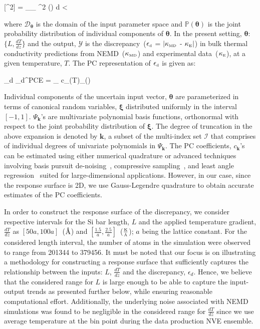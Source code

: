 \be
{}[^2] = \int_{_{\bm{\theta}}} ^2 (\bm{\theta}) 
d\bm{\theta} < \infty
\ee

\noindent where $\mathcal{D}_{\bm{\theta}}$ is the domain of the input parameter space and 
$\mathbb{P}(\bm{\theta})$ is the joint probability distribution of individual components of $\bm{\theta}$.
In the present setting, $\bm{\theta}$:~$\{L,\frac{dT}{dz}\}$ and the output, $\mathcal{Y}$ is the
discrepancy~($\epsilon_{\mbox{\tiny{d}}}$ = 
$\lvert\kappa_{\mbox{\tiny{MD}}}$ - $\kappa_{\mbox{\tiny{E}}}\rvert$)
in bulk thermal conductivity predictions from 
NEMD~($\kappa_{\mbox{\tiny{MD}}}$) and experimental data~($\kappa_{\mbox{\tiny{E}}}$), at a 
given temperature, $T$. The PC representation of $\epsilon_{\mbox{\tiny{d}}}$ is given as:

\be
\epsilon_{\mbox{\tiny{d}}} \approx \mathcal{\epsilon}_{\mbox{\tiny{d}}}^{\mbox{\tiny{PCE}}} = 
\sum_{\in{}} c_{}(T)\Psi_{}(\bm{\xi(\theta)}) 
\ee

\noindent Individual components of the uncertain input vector, $\bm{\theta}$ are parameterized in terms of canonical random 
variables, $\bm{\xi}$ distributed uniformly in the interval $[-1,1]$. 
 $\Psi_{\bm{k}}$'s are multivariate polynomial basis functions, orthonormal with respect to the joint probability 
 distribution of $\bm{\xi}$. The degree of truncation in the above expansion is denoted by $\bm{k}$, a subset of
 the multi-index set $\mathcal{I}$ that comprises of individual degrees of univariate polynomials in $\Psi_{\bm{k}}$.
The PC coefficients, $c_{\bm{k}}$'s can be estimated using either numerical quadrature or advanced techniques
involving basis pursuit de-noising~\cite{Peng:2014}, compressive
sampling~\cite{Hampton:2015}, and least angle regression~\cite{Blatman:2011} suited for large-dimensional
applications. However, in our case, since the response surface is 2D, we use Gauss-Legendre quadrature to
obtain accurate estimates of the PC coefficients. 
\bigskip

In order to construct the response surface of the discrepancy, we consider respective intervals for the Si bar length,
$L$ and the applied temperature gradient, $\frac{dT}{dz}$ as $[50a,100a]$~($\mbox{\normalfont\AA}$) and
 $[\frac{1.5}{a},\frac{2.5}{a}]$~($\frac{\mbox{\tiny{K}}}{\tiny{\mbox{\normalfont\AA}}}$); $a$ being the lattice constant. For the considered length interval, the number of atoms in the
simulation were observed to range from 201344 to 379456. It must be noted that our 
focus is on illustrating a methodology for constructing a response surface that
sufficiently captures the relationship between the inputs: $L$, $\frac{dT}{dz}$ and
the discrepancy, $\epsilon_d$. Hence, we believe
that the considered range for $L$ is large enough to be able to capture the input-output
trends as presented further below, while ensuring reasonable computational effort.
Additionally, the underlying noise associated with NEMD simulations was found to be
negligible in the considered range for $\frac{dT}{dz}$ since we use average temperature
at the bin point during the data production NVE ensemble.
 
